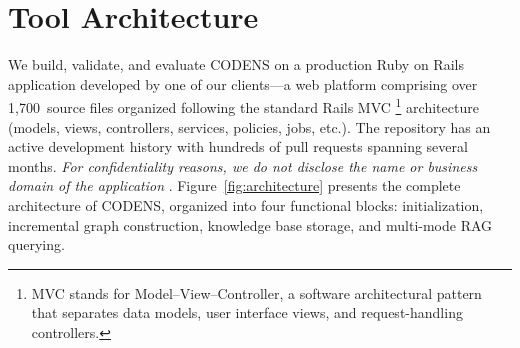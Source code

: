 \documentclass[sigconf]{acmart}
\begin{document}

\section{Tool Architecture}

We build, validate, and evaluate CODENS on a production Ruby on Rails application developed by one of our clients---a web platform comprising over 1,700~source files organized following the standard Rails MVC \footnote{MVC stands for Model--View--Controller, a software architectural pattern that separates data models, user interface views, and request-handling controllers.} architecture (models, views, controllers, services, policies, jobs, etc.). The repository has an active development history with hundreds of pull requests spanning several months. \textit{For confidentiality reasons, we do not disclose the name or business domain of the application }. Figure~\ref{fig:architecture} presents the complete architecture of CODENS, organized into four functional blocks: initialization, incremental graph construction, knowledge base storage, and multi-mode RAG querying.
\end{document}

